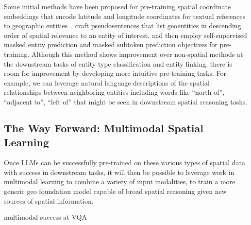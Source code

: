 Some initial methods have been proposed for pre-training spatial coordinate embeddings that encode latitude and longitude coordinates for textual references to geographic entities~\cite{Li2021}.
\citeauthor{Li2021} craft pseudosentences that list geoentities in descending order of spatial relevance to an entity of interest, and then employ self-supervised masked entity prediction and masked subtoken prediction objectives for pre-training.
Although this method shows improvement over non-spatial methods at the downstream tasks of entity type classification and entity linking, there is room for improvement by developing more intuitive pre-training tasks.
For example, we can leverage natural language descriptions of the spatial relationships between neighboring entities including words like ``north of'', ``adjacent to'', ``left of'' that might be seen in downstream spatial reasoning tasks.



\subsection{The Way Forward: Multimodal Spatial Learning}
Once LLMs can be successfully pre-trained on these various types of spatial data with success in downstream tasks, it will then be possible to leverage work in multimodal learning to combine a variety of input modalities, to train a more generic geo foundation model capable of broad spatial reasoning given new sources of spatial information.


\cite{Fei2022} multimodal success at VQA

